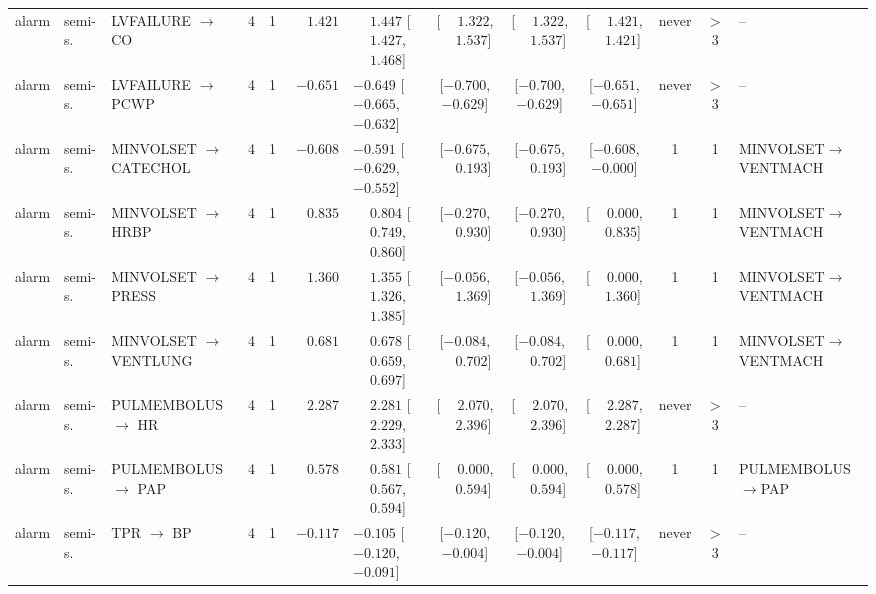 \begin{landscape}
\begin{longtable}{@{}llp{2.15cm}ccrl cccc c l@{}}
alarm & semi-s. & LVFAILURE $\to$ CO & 4 & 1 & $\phantom{-}1.421$ & $\phantom{-}1.447$ [$\phantom{-}1.427$, $\phantom{-}1.468$] & [$\phantom{-}1.322$, $\phantom{-}1.537$] & [$\phantom{-}1.322$, $\phantom{-}1.537$] & [$\phantom{-}1.421$, $\phantom{-}1.421$] & never & $>$3 & -- \\
alarm & semi-s. & LVFAILURE $\to$ PCWP & 4 & 1 & $-0.651$ & $-0.649$ [$-0.665$, $-0.632$] & [$-0.700$, $-0.629$] & [$-0.700$, $-0.629$] & [$-0.651$, $-0.651$] & never & $>$3 & -- \\
alarm & semi-s. & MINVOLSET $\to$ CATECHOL & 4 & 1 & $-0.608$ & $-0.591$ [$-0.629$, $-0.552$] & [$-0.675$, $\phantom{-}0.193$] & [$-0.675$, $\phantom{-}0.193$] & [$-0.608$, $-0.000$] & 1 & 1 & MINVOLSET$\to$VENTMACH \\
alarm & semi-s. & MINVOLSET $\to$ HRBP & 4 & 1 & $\phantom{-}0.835$ & $\phantom{-}0.804$ [$\phantom{-}0.749$, $\phantom{-}0.860$] & [$-0.270$, $\phantom{-}0.930$] & [$-0.270$, $\phantom{-}0.930$] & [$\phantom{-}0.000$, $\phantom{-}0.835$] & 1 & 1 & MINVOLSET$\to$VENTMACH \\
alarm & semi-s. & MINVOLSET $\to$ PRESS & 4 & 1 & $\phantom{-}1.360$ & $\phantom{-}1.355$ [$\phantom{-}1.326$, $\phantom{-}1.385$] & [$-0.056$, $\phantom{-}1.369$] & [$-0.056$, $\phantom{-}1.369$] & [$\phantom{-}0.000$, $\phantom{-}1.360$] & 1 & 1 & MINVOLSET$\to$VENTMACH \\
alarm & semi-s. & MINVOLSET $\to$ VENTLUNG & 4 & 1 & $\phantom{-}0.681$ & $\phantom{-}0.678$ [$\phantom{-}0.659$, $\phantom{-}0.697$] & [$-0.084$, $\phantom{-}0.702$] & [$-0.084$, $\phantom{-}0.702$] & [$\phantom{-}0.000$, $\phantom{-}0.681$] & 1 & 1 & MINVOLSET$\to$VENTMACH \\
alarm & semi-s. & PULMEMBOLUS $\to$ HR & 4 & 1 & $\phantom{-}2.287$ & $\phantom{-}2.281$ [$\phantom{-}2.229$, $\phantom{-}2.333$] & [$\phantom{-}2.070$, $\phantom{-}2.396$] & [$\phantom{-}2.070$, $\phantom{-}2.396$] & [$\phantom{-}2.287$, $\phantom{-}2.287$] & never & $>$3 & -- \\
alarm & semi-s. & PULMEMBOLUS $\to$ PAP & 4 & 1 & $\phantom{-}0.578$ & $\phantom{-}0.581$ [$\phantom{-}0.567$, $\phantom{-}0.594$] & [$\phantom{-}0.000$, $\phantom{-}0.594$] & [$\phantom{-}0.000$, $\phantom{-}0.594$] & [$\phantom{-}0.000$, $\phantom{-}0.578$] & 1 & 1 & PULMEMBOLUS$\to$PAP \\
alarm & semi-s. & TPR $\to$ BP & 4 & 1 & $-0.117$ & $-0.105$ [$-0.120$, $-0.091$] & [$-0.120$, $-0.004$] & [$-0.120$, $-0.004$] & [$-0.117$, $-0.117$] & never & $>$3 & -- \\

\end{longtable}
\end{landscape}
